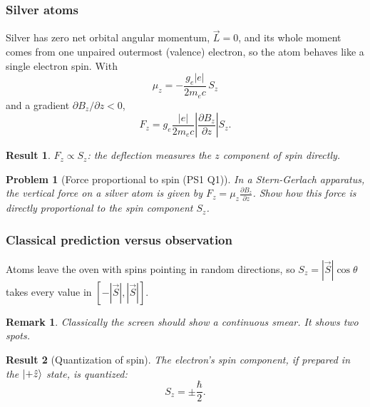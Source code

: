 \documentclass{article}
\newtheorem{problem}{Problem}
\newtheorem{remark}{Remark}
\newtheorem{result}{Result}
\begin{document}
\subsubsection{Silver atoms}
Silver has zero net orbital angular momentum, $\vec{L} = 0$, and its whole moment comes from one unpaired outermost (valence) electron, so the atom behaves like a single electron spin. With
\[\mu_{z} = -\frac{g_{e}|e|}{2m_{e}c}\,S_{z}\]
and a gradient $\partial B_{z}/\partial z < 0$,
\[F_{z} = g_{e}\frac{|e|}{2m_{e}c}\left|\frac{\partial B_{z}}{\partial z}\right| S_{z}.\]
\begin{result}
    $F_{z} \propto S_{z}$: the deflection measures the $z$ component of spin directly.
\end{result}
\begin{problem}[Force proportional to spin (PS1 Q1)]
    In a Stern-Gerlach apparatus, the vertical force on a silver atom is given by $F_z = \mu_z\frac{\partial B_z}{\partial z}$. Show how this force is directly proportional to the spin component $S_z$.
\end{problem}

\subsubsection{Classical prediction versus observation}
Atoms leave the oven with spins pointing in random directions, so $S_z = |\vec{S}|\cos\theta$ takes every value in $[-|\vec{S}|,|\vec{S}|]$.
\begin{remark}
    Classically the screen should show a continuous smear. It shows two spots.
\end{remark}
\begin{result}[Quantization of spin]
    The electron's spin component, if prepared in the $\ket{+\hat{z}}$ state, is quantized:
    \begin{equation}
        S_{z} = \pm\frac{\hbar}{2}.
    \end{equation}
\end{result}
\end{document}
